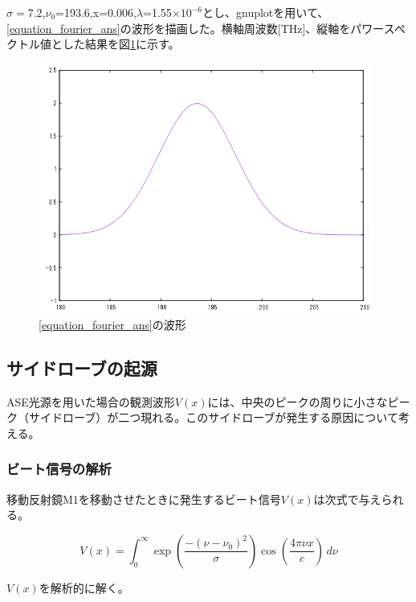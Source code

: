 \documentclass[uplatex, titlepage, fontsize=10pt, paper=a4paper]{jsarticle}
\numberwithin{equation}{section}
\begin{document}
\vspace{3mm}

$\sigma=7.2$,$\nu_{0}$=193.6,x=0.006,$\lambda$=1.55$\times 10^{-6}$とし、gnuplotを用いて、\eqref{equation_fourier_ans}の波形を描画した。横軸周波数[THz]、縦軸をパワースペクトル値とした結果を図\ref{result_spector_wave}に示す。

\begin{figure}[h]
    \centering
    \includegraphics[width = 11cm]{画像フォルダ/result_spector.png}
    \caption{\eqref{equation_fourier_ans}の波形}
    \label{result_spector_wave}
\end{figure}

\subsection{サイドローブの起源}
ASE光源を用いた場合の観測波形$V(x)$には、中央のピークの周りに小さなピーク（サイドローブ）が二つ現れる。このサイドローブが発生する原因について考える。

\subsubsection{ビート信号の解析}
移動反射鏡M1を移動させたときに発生するビート信号$V(x)$は次式で与えられる。

\begin{equation}
    V(x)=\int_{0}^{\infty} \exp\left(\frac{-(\nu-\nu_0)^2}{\sigma}\right)\cos\left(\frac{4{\pi}{\nu}x}{c}\right) \,d\nu
\end{equation}

$V(x)$を解析的に解く。\cite{integral_calculator}
\end{document}
